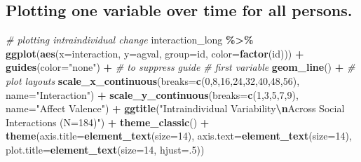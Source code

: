 \documentclass[
]{book}
\newenvironment{Shaded}{\begin{snugshade}}{\end{snugshade}}
\newcommand{\AttributeTok}[1]{\textcolor[rgb]{0.13,0.29,0.53}{#1}}
\newcommand{\CommentTok}[1]{\textcolor[rgb]{0.56,0.35,0.01}{\textit{#1}}}
\newcommand{\DecValTok}[1]{\textcolor[rgb]{0.00,0.00,0.81}{#1}}
\newcommand{\FunctionTok}[1]{\textcolor[rgb]{0.13,0.29,0.53}{\textbf{#1}}}
\newcommand{\NormalTok}[1]{#1}
\newcommand{\SpecialCharTok}[1]{\textcolor[rgb]{0.81,0.36,0.00}{\textbf{#1}}}
\newcommand{\StringTok}[1]{\textcolor[rgb]{0.31,0.60,0.02}{#1}}
\theoremstyle{definition}
\theoremstyle{definition}
\theoremstyle{definition}
\theoremstyle{definition}
\theoremstyle{remark}
\begin{document}
\subsection{Plotting one variable over time for all persons.}\label{plotting-one-variable-over-time-for-all-persons.}

\begin{Shaded}
\begin{Highlighting}[]
\CommentTok{\# plotting intraindividual change }
\NormalTok{interaction\_long }\SpecialCharTok{\%\textgreater{}\%}
  \FunctionTok{ggplot}\NormalTok{(}\FunctionTok{aes}\NormalTok{(}\AttributeTok{x=}\NormalTok{interaction, }\AttributeTok{y=}\NormalTok{agval, }\AttributeTok{group=}\NormalTok{id, }\AttributeTok{color=}\FunctionTok{factor}\NormalTok{(id))) }\SpecialCharTok{+}
  \FunctionTok{guides}\NormalTok{(}\AttributeTok{color=}\StringTok{"none"}\NormalTok{) }\SpecialCharTok{+} \CommentTok{\# to suppress guide}
  \CommentTok{\# first variable}
  \FunctionTok{geom\_line}\NormalTok{() }\SpecialCharTok{+}
  \CommentTok{\# plot layouts}
  \FunctionTok{scale\_x\_continuous}\NormalTok{(}\AttributeTok{breaks=}\FunctionTok{c}\NormalTok{(}\DecValTok{0}\NormalTok{,}\DecValTok{8}\NormalTok{,}\DecValTok{16}\NormalTok{,}\DecValTok{24}\NormalTok{,}\DecValTok{32}\NormalTok{,}\DecValTok{40}\NormalTok{,}\DecValTok{48}\NormalTok{,}\DecValTok{56}\NormalTok{), }\AttributeTok{name=}\StringTok{"Interaction"}\NormalTok{) }\SpecialCharTok{+}
  \FunctionTok{scale\_y\_continuous}\NormalTok{(}\AttributeTok{breaks=}\FunctionTok{c}\NormalTok{(}\DecValTok{1}\NormalTok{,}\DecValTok{3}\NormalTok{,}\DecValTok{5}\NormalTok{,}\DecValTok{7}\NormalTok{,}\DecValTok{9}\NormalTok{), }\AttributeTok{name=}\StringTok{"Affect Valence"}\NormalTok{) }\SpecialCharTok{+}  
  \FunctionTok{ggtitle}\NormalTok{(}\StringTok{"Intraindividual Variability}\SpecialCharTok{\textbackslash{}n}\StringTok{Across Social Interactions (N=184)"}\NormalTok{) }\SpecialCharTok{+}
  \FunctionTok{theme\_classic}\NormalTok{() }\SpecialCharTok{+}
  \FunctionTok{theme}\NormalTok{(}\AttributeTok{axis.title=}\FunctionTok{element\_text}\NormalTok{(}\AttributeTok{size=}\DecValTok{14}\NormalTok{),}
        \AttributeTok{axis.text=}\FunctionTok{element\_text}\NormalTok{(}\AttributeTok{size=}\DecValTok{14}\NormalTok{),}
        \AttributeTok{plot.title=}\FunctionTok{element\_text}\NormalTok{(}\AttributeTok{size=}\DecValTok{14}\NormalTok{, }\AttributeTok{hjust=}\NormalTok{.}\DecValTok{5}\NormalTok{))}
\end{Highlighting}
\end{Shaded}
\end{document}
